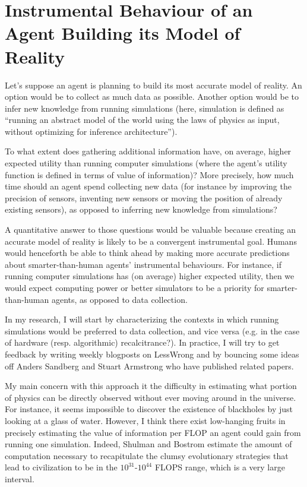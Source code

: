 \documentclass{article}
\begin{document}
\section*{Instrumental Behaviour of an Agent Building its Model of Reality}

Let’s suppose an agent is planning to build its most accurate model of reality. An option would be to collect as much data as possible. Another option would be to infer new knowledge from running simulations (here, simulation is defined as “running an abstract model of the world using the laws of physics as input, without optimizing for inference architecture”).

To what extent does gathering additional information have, on average, higher expected utility than running computer simulations (where the agent’s utility function is defined in terms of value of information)? More precisely, how much time should an agent spend collecting new data (for instance by improving the precision of sensors, inventing new sensors or moving the position of already existing sensors), as opposed to inferring new knowledge from simulations?

A quantitative answer to those questions would be valuable because creating an accurate model of reality is likely to be a convergent instrumental goal\cite{omohundro2008basic}. Humans would henceforth be able to think ahead by making more accurate predictions about smarter-than-human agents’ instrumental behaviours. For instance, if running computer simulations has (on average) higher expected utility, then we would expect computing power or better simulators to be a priority for smarter-than-human agents, as opposed to data collection.

In my research, I will start by characterizing the contexts in which running simulations would be preferred to data collection, and vice versa (e.g. in the case of hardware (resp. algorithmic) recalcitrance\cite{Bostrom2014}?). In practice, I will try to get feedback by writing weekly blogposts on LessWrong and by bouncing some ideas off Anders Sandberg and Stuart Armstrong who have published related papers\cite{sandberg2017not}\cite{sandberg2018space}. 

My main concern with this approach it the difficulty in estimating what portion of physics can be directly observed without ever moving around in the universe. For instance, it seems impossible to discover the existence of blackholes by just looking at a glass of water. However, I think there exist low-hanging fruits in precisely estimating the value of information per FLOP an agent could gain from running one simulation. Indeed, Shulman and Bostrom estimate the amount of computation necessary to recapitulate the clumsy evolutionary strategies that lead to civilization to be in the $10^{31}$-$10^{44}$ FLOPS range\cite{shulman2012hard}, which is a very large interval.
\end{document}
